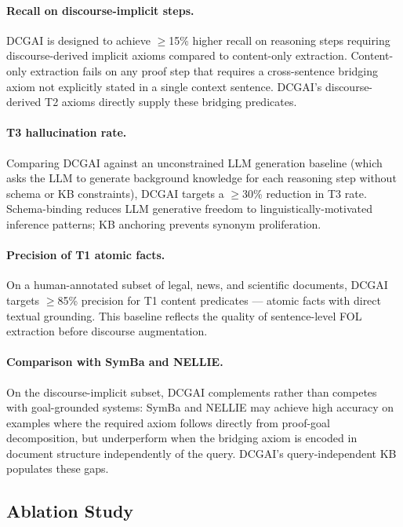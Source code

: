 \documentclass[11pt,letterpaper]{article}
\begin{document}
\paragraph{Recall on discourse-implicit steps.}
DCGAI is designed to achieve $\geq$15\% higher recall on reasoning steps requiring discourse-derived implicit axioms
compared to content-only extraction. Content-only extraction fails on any proof step that requires a cross-sentence
bridging axiom not explicitly stated in a single context sentence. DCGAI's discourse-derived T2 axioms directly
supply these bridging predicates.

\paragraph{T3 hallucination rate.}
Comparing DCGAI against an unconstrained LLM generation baseline (which asks the LLM to generate background
knowledge for each reasoning step without schema or KB constraints), DCGAI targets a $\geq$30\% reduction in T3
rate. Schema-binding reduces LLM generative freedom to linguistically-motivated inference patterns; KB anchoring
prevents synonym proliferation.

\paragraph{Precision of T1 atomic facts.}
On a human-annotated subset of legal, news, and scientific documents, DCGAI targets $\geq$85\% precision for T1
content predicates --- atomic facts with direct textual grounding. This baseline reflects the quality of
sentence-level FOL extraction before discourse augmentation.

\paragraph{Comparison with SymBa and NELLIE.}
On the discourse-implicit subset, DCGAI complements rather than competes with goal-grounded systems: SymBa and
NELLIE may achieve high accuracy on examples where the required axiom follows directly from proof-goal
decomposition, but underperform when the bridging axiom is encoded in document structure independently of the
query. DCGAI's query-independent KB populates these gaps.

\subsection{Ablation Study}
\end{document}
